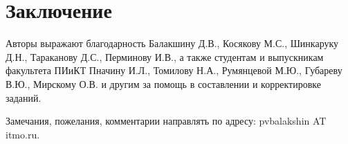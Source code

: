 \section*{Заключение}

Авторы выражают благодарность Балакшину Д.В., Косякову М.С., Шинкаруку Д.Н., Тараканову Д.С., Перминову И.В., а также студентам и выпускникам факультета ПИиКТ Пначину И.Л., Томилову Н.А., Румянцевой М.Ю., Губареву В.Ю., Мирскому О.В. и другим за помощь в составлении и корректировке заданий.

Замечания, пожелания, комментарии направлять по адресу: pvbalakshin AT itmo.ru. 
